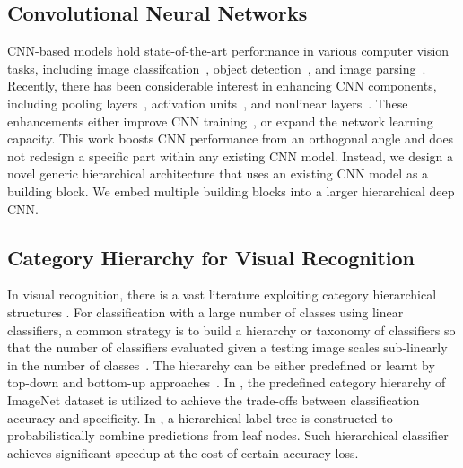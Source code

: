 \documentclass[10pt,twocolumn,letterpaper]{article}
\begin{document}
\subsection{Convolutional Neural Networks}
CNN-based models hold state-of-the-art performance in various computer vision tasks, including image classifcation~\cite{krizhevsky2012imagenet}, object detection~\cite{girshick2014rcnn,he2014spatial}, and image parsing~\cite{farabet2013learning}.
Recently, there has been considerable interest in enhancing CNN components, including pooling layers~\cite{zeiler2013stochastic}, activation units~\cite{goodfellow2013maxout,springenberg2013improving}, and nonlinear layers~\cite{LinCY13}. These enhancements either improve CNN training~\cite{zeiler2013stochastic}, or expand the network learning capacity. This work boosts CNN performance from an orthogonal angle and does not redesign a specific part within any existing CNN model. Instead, we design a novel generic hierarchical architecture that uses an existing CNN model as a building block. We embed multiple building blocks into a larger hierarchical deep CNN.


\subsection{Category Hierarchy for Visual Recognition}
In visual recognition, there is a vast literature exploiting category hierarchical structures \cite{tousch2012semantic}. For classification with a large number of classes using linear classifiers, a common strategy is to build a hierarchy or taxonomy of classifiers so that the number of classifiers evaluated given a testing image scales sub-linearly in the number of classes~\cite{bengio2010label,gao2011discriminative}. The hierarchy can be either predefined\cite{marszalek2007semantic,verma2012learning,jia2013visual} or learnt by top-down and bottom-up approaches~\cite{salakhutdinov2011learning, griffin2008learning,marszalek2008constructing,li2010building,bannour2012hierarchical,deng2011fast,sivic2008unsupervised}. In \cite{deng2012hedging}, the predefined category hierarchy of ImageNet dataset is utilized to achieve the trade-offs between classification accuracy and specificity. In \cite{liu2013probabilistic}, a hierarchical label tree is constructed to probabilistically combine predictions from leaf nodes. Such hierarchical classifier achieves significant speedup at the cost of certain accuracy loss.
\end{document}
